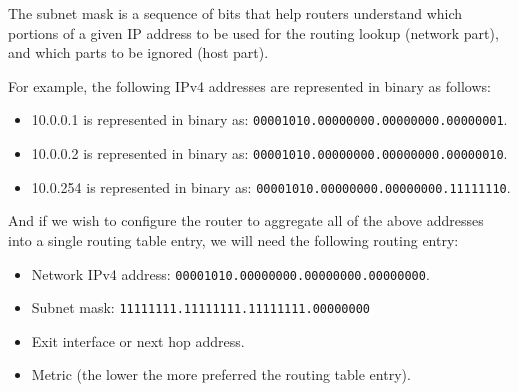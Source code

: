 \documentclass[pdftex,12pt,a4paper]{article}
\begin{document}
            The subnet mask is a sequence of bits that help routers understand
            which portions of a given IP address to be used for the routing
            lookup (network part), and which parts to be ignored (host part).

            For example, the following IPv4 addresses are represented in binary
            as follows:
            \begin{itemize}
                \item 10.0.0.1 is represented in binary as:
                    \texttt{00001010.00000000.00000000.00000001}.
                \item 10.0.0.2 is represented in binary as:
                    \texttt{00001010.00000000.00000000.00000010}.
                \item 10.0.254 is represented in binary as:
                    \texttt{00001010.00000000.00000000.11111110}.
            \end{itemize}

            And if we wish to configure the router to aggregate all of the
            above addresses into a single routing table entry, we will need the
            following routing entry:
            \begin{itemize}
                \item Network IPv4 address:
                    \texttt{00001010.00000000.00000000.00000000}.
                \item Subnet mask: \texttt{11111111.11111111.11111111.00000000}
                \item Exit interface or next hop address.
                \item Metric (the lower the more preferred the routing table entry).
            \end{itemize}
\end{document}
